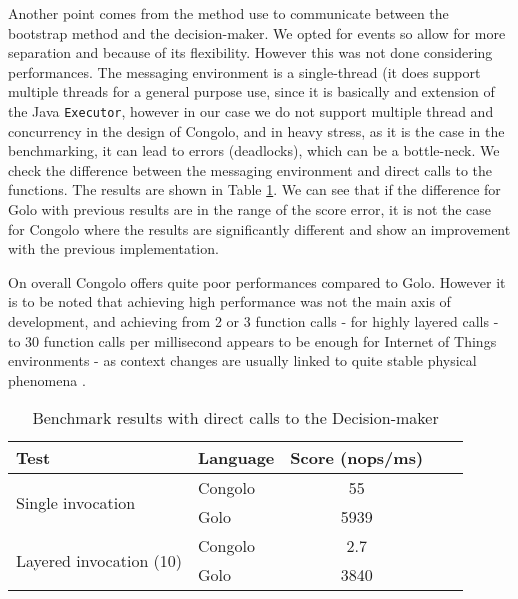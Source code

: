 \documentclass{sig-alternate}
\begin{document}
Another point comes from the method use to communicate between the bootstrap method and the decision-maker. We opted for events so allow for more separation and because of its flexibility. However this was not done considering performances. The messaging environment is a single-thread (it does support multiple threads for a general purpose use, since it is basically and extension of the Java \lstinline|Executor|, however in our case we do not support multiple thread and concurrency in the design of Congolo, and in heavy stress, as it is the case in the benchmarking, it can lead to errors (deadlocks), which can be a bottle-neck. We check the difference between the messaging environment and direct calls to the functions. The results are shown in Table \ref{table:benchmarking_direct}. We can see that if the difference for Golo with previous results are in the range of the score error, it is not the case for Congolo where the results are significantly different and show an improvement with the previous implementation.

On overall Congolo offers quite poor performances compared to Golo. However it is to be noted that achieving high performance was not the main axis of development, and achieving from 2 or 3 function calls - for highly layered calls - to 30 function calls per millisecond appears to be enough for Internet of Things environments - as context changes are usually linked to quite stable physical phenomena \cite{RELEASeD-2010-857551}.

\begin{table}
\begin{adjustbox}{center}
\begin{tabular}{l p{2cm} | c | c | c |}
        \hline
                Test & Language & Score (nops/ms) \\
                
        \hline
        \multirow{2}{*}{Single invocation} 
                & Congolo & 55 \\
                & Golo & 5939 \\

        \hline
    \multirow{2}{*}{Layered invocation (10)} 
                & Congolo & 2.7 \\
                & Golo & 3840 \\                
\end{tabular}
\end{adjustbox}
        \caption{Benchmark results with direct calls to the Decision-maker}
        \label{table:benchmarking_direct}
\end{table}
 
\end{document}

